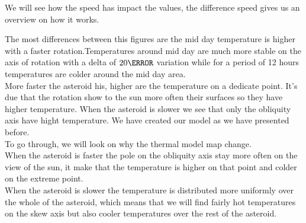 We will see how the speed has impact the values, the difference speed gives us an overview on how it works.

The most differences between this figures are the mid day temperature is higher with a faster rotation.Temperatures around mid day are much more stable on the axis of rotation with a delta of $20 \degree$ variation while for a period of 12 hours temperatures are colder around the mid day area.\\[10pt]

More faster the asteroid his, higher are the temperature on a dedicate point. It's due that the rotation show to the sun more often their surfaces so they have higher temperature.
When the asteroid is slower we see that only the obliquity axis have hight temperature. We have created our model as we have presented before. \\[10pt]
To go through, we will look on why the thermal model map change.\\ [10pt]
When the asteroid is faster the pole on the obliquity axis stay more often on the view of the sun, it make that the temperature is higher on that point and colder on the extreme point.\\ [10pt]
When the asteroid is slower the temperature is distributed more uniformly over the whole of the asteroid, which means that we will find fairly hot temperatures on the skew axis but also cooler temperatures over the rest of the asteroid.\\[11pt]
